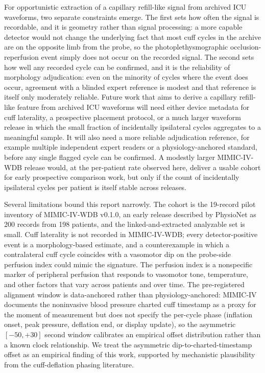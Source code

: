 \documentclass[twocolumn,letterpaper,10pt]{article}
\begin{document}
For opportunistic extraction of a capillary refill-like signal from archived ICU waveforms, two separate constraints emerge. The first sets how often the signal is recordable, and it is geometry rather than signal processing: a more capable detector would not change the underlying fact that most cuff cycles in the archive are on the opposite limb from the probe, so the photoplethysmographic occlusion-reperfusion event simply does not occur on the recorded signal. The second sets how well any recorded cycle can be confirmed, and it is the reliability of morphology adjudication: even on the minority of cycles where the event does occur, agreement with a blinded expert reference is modest and that reference is itself only moderately reliable. Future work that aims to derive a capillary refill-like feature from archived ICU waveforms will need either device metadata for cuff laterality, a prospective placement protocol, or a much larger waveform release in which the small fraction of incidentally ipsilateral cycles aggregates to a meaningful sample. It will also need a more reliable adjudication reference, for example multiple independent expert readers or a physiology-anchored standard, before any single flagged cycle can be confirmed. A modestly larger MIMIC-IV-WDB release would, at the per-patient rate observed here, deliver a usable cohort for early prospective comparison work, but only if the count of incidentally ipsilateral cycles per patient is itself stable across releases.

Several limitations bound this report narrowly. The cohort is the 19-record pilot inventory of MIMIC-IV-WDB v0.1.0, an early release described by PhysioNet as 200 records from 198 patients, and the linked-and-extracted analyzable set is small. Cuff laterality is not recorded in MIMIC-IV-WDB; every detector-positive event is a morphology-based estimate, and a counterexample in which a contralateral cuff cycle coincides with a vasomotor dip on the probe-side perfusion index could mimic the signature. The perfusion index is a nonspecific marker of peripheral perfusion that responds to vasomotor tone, temperature, and other factors that vary across patients and over time.\cite{sun2024_pi_review,abay2016_ppg_occlusion} The pre-registered alignment window is data-anchored rather than physiology-anchored: MIMIC-IV documents the noninvasive blood pressure charted cuff timestamp as a proxy for the moment of measurement but does not specify the per-cycle phase (inflation onset, peak pressure, deflation end, or display update), so the asymmetric $[-50, +30]$ second window calibrates an empirical offset distribution rather than a known clock relationship.\cite{johnson2023_mimic4} We treat the asymmetric dip-to-charted-timestamp offset as an empirical finding of this work, supported by mechanistic plausibility from the cuff-deflation phasing literature.\cite{celler2024_inflation_deflation,alpert2014_oscillometric_review}
\end{document}
